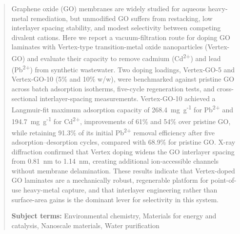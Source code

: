 \begin{abstract}
\noindent Graphene oxide (GO) membranes are widely studied for aqueous heavy-metal remediation, but unmodified GO suffers from restacking, low interlayer spacing stability, and modest selectivity between competing divalent cations. Here we report a vacuum-filtration route for doping GO laminates with Vertex-type transition-metal oxide nanoparticles (Vertex-GO) and evaluate their capacity to remove cadmium (Cd\textsuperscript{2+}) and lead (Pb\textsuperscript{2+}) from synthetic wastewater. Two doping loadings, Vertex-GO-5 and Vertex-GO-10 (5\% and 10\% w/w), were benchmarked against pristine GO across batch adsorption isotherms, five-cycle regeneration tests, and cross-sectional interlayer-spacing measurements. Vertex-GO-10 achieved a Langmuir-fit maximum adsorption capacity of 268.4~mg~g\textsuperscript{-1} for Pb\textsuperscript{2+} and 194.7~mg~g\textsuperscript{-1} for Cd\textsuperscript{2+}, improvements of 61\% and 54\% over pristine GO, while retaining 91.3\% of its initial Pb\textsuperscript{2+} removal efficiency after five adsorption--desorption cycles, compared with 68.9\% for pristine GO. X-ray diffraction confirmed that Vertex doping widens the GO interlayer spacing from 0.81~nm to 1.14~nm, creating additional ion-accessible channels without membrane delamination. These results indicate that Vertex-doped GO laminates are a mechanically robust, regenerable platform for point-of-use heavy-metal capture, and that interlayer engineering rather than surface-area gains is the dominant lever for selectivity in this system.

\medskip
\noindent\textbf{Subject terms:} Environmental chemistry, Materials for energy and catalysis, Nanoscale materials, Water purification
\end{abstract}
